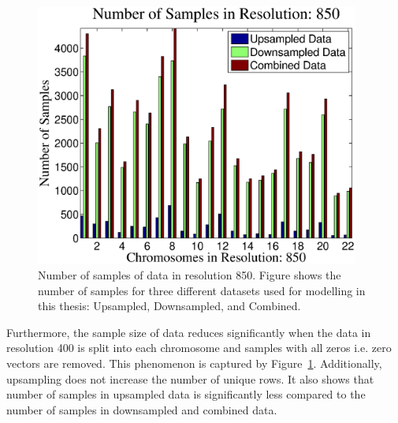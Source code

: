 \begin{figure}[h!]
\centering
\includegraphics[width=0.95\textwidth]{figures/numsamples850}
\caption[Number of samples of data in resolution 850]{Number of samples of data in resolution 850. Figure shows the number of samples for three different datasets used for modelling in this thesis: Upsampled, Downsampled, and Combined.}\label{Fig:datasamples}
\end{figure}

Furthermore, the sample size of data reduces significantly when the data in resolution 400 is split into each chromosome and samples with all zeros i.e. zero vectors are removed. This phenomenon is captured by Figure~\ref{Fig:datasamples}. Additionally, upsampling does not increase the number of unique rows. It also shows that number of samples in upsampled data is significantly less compared to the number of samples in downsampled and combined data. 


